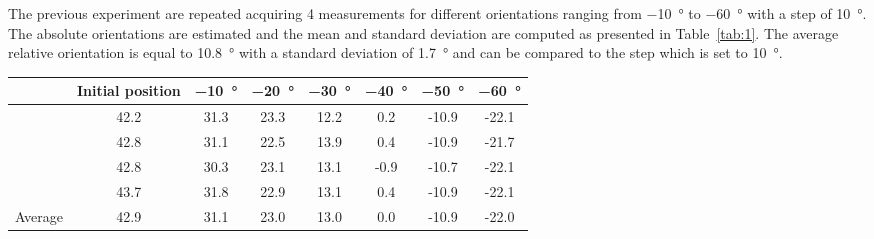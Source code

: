 
The previous experiment are repeated acquiring 4 measurements for different orientations ranging from \SI{-10}{\degree} to \SI{-60}{\degree} with a step of \SI{10}{\degree}.
The absolute orientations are estimated and the mean and standard deviation are computed as presented in Table~\ref{tab:1}.
The average relative orientation is equal to \SI{10.8}{\degree} with a standard deviation of \SI{1.7}{\degree} and can be compared to the step which is set to \SI{10}{\degree}.

\begin{table*}[h]
\caption{Fiber orientation evaluation.} 
\label{tab:1}
\begin{center}       
\begin{tabular}{lccccccc} %
\hline
\rule[-1ex]{0pt}{3.5ex}  & Initial position & \SI{-10}{\degree} & \SI{-20}{\degree} & \SI{-30}{\degree} & \SI{-40}{\degree} & \SI{-50}{\degree} & \SI{-60}{\degree} \\
\hline\hline
\rule[-1ex]{0pt}{3.5ex}  \multirow{4}{*}{Measurements} & 42.2 & 31.3 & 23.3 & 12.2 & 0.2 & -10.9 & -22.1  \\
\rule[-1ex]{0pt}{3.5ex}   & 42.8 & 31.1 & 22.5 & 13.9 & 0.4 & -10.9 & -21.7  \\
\rule[-1ex]{0pt}{3.5ex}   & 42.8 & 30.3 & 23.1 & 13.1 & -0.9 & -10.7 & -22.1  \\
\rule[-1ex]{0pt}{3.5ex}   & 43.7 & 31.8 & 22.9 & 13.1 & 0.4 & -10.9 & -22.1  \\
\hline
\rule[-1ex]{0pt}{3.5ex}  Average & 42.9 & 31.1 & 23.0 & 13.0 & 0.0 & -10.9 & -22.0 \\
\hline
\end{tabular}
\end{center}
\end{table*}

